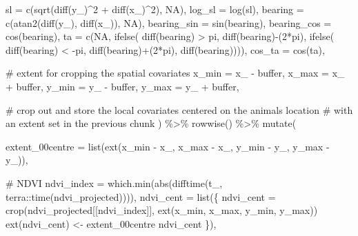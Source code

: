 \documentclass[
  letterpaper,
  DIV=11,
  numbers=noendperiod]{scrartcl}
\newenvironment{Shaded}{\begin{snugshade}}{\end{snugshade}}
\newcommand{\AttributeTok}[1]{\textcolor[rgb]{0.40,0.45,0.13}{#1}}
\newcommand{\CommentTok}[1]{\textcolor[rgb]{0.37,0.37,0.37}{#1}}
\newcommand{\ConstantTok}[1]{\textcolor[rgb]{0.56,0.35,0.01}{#1}}
\newcommand{\DecValTok}[1]{\textcolor[rgb]{0.68,0.00,0.00}{#1}}
\newcommand{\FunctionTok}[1]{\textcolor[rgb]{0.28,0.35,0.67}{#1}}
\newcommand{\NormalTok}[1]{\textcolor[rgb]{0.00,0.23,0.31}{#1}}
\newcommand{\OtherTok}[1]{\textcolor[rgb]{0.00,0.23,0.31}{#1}}
\newcommand{\SpecialCharTok}[1]{\textcolor[rgb]{0.37,0.37,0.37}{#1}}
\begin{document}
\begin{Shaded}
\begin{Highlighting}[]
    \AttributeTok{sl =} \FunctionTok{c}\NormalTok{(}\FunctionTok{sqrt}\NormalTok{(}\FunctionTok{diff}\NormalTok{(y\_)}\SpecialCharTok{\^{}}\DecValTok{2} \SpecialCharTok{+} \FunctionTok{diff}\NormalTok{(x\_)}\SpecialCharTok{\^{}}\DecValTok{2}\NormalTok{), }\ConstantTok{NA}\NormalTok{),}
    \AttributeTok{log\_sl =} \FunctionTok{log}\NormalTok{(sl),}
    \AttributeTok{bearing =} \FunctionTok{c}\NormalTok{(}\FunctionTok{atan2}\NormalTok{(}\FunctionTok{diff}\NormalTok{(y\_), }\FunctionTok{diff}\NormalTok{(x\_)), }\ConstantTok{NA}\NormalTok{),}
    \AttributeTok{bearing\_sin =} \FunctionTok{sin}\NormalTok{(bearing),}
    \AttributeTok{bearing\_cos =} \FunctionTok{cos}\NormalTok{(bearing),}
    \AttributeTok{ta =} \FunctionTok{c}\NormalTok{(}\ConstantTok{NA}\NormalTok{, }\FunctionTok{ifelse}\NormalTok{(}
      \FunctionTok{diff}\NormalTok{(bearing) }\SpecialCharTok{\textgreater{}}\NormalTok{ pi, }\FunctionTok{diff}\NormalTok{(bearing)}\SpecialCharTok{{-}}\NormalTok{(}\DecValTok{2}\SpecialCharTok{*}\NormalTok{pi), }\FunctionTok{ifelse}\NormalTok{(}
        \FunctionTok{diff}\NormalTok{(bearing) }\SpecialCharTok{\textless{}} \SpecialCharTok{{-}}\NormalTok{pi, }\FunctionTok{diff}\NormalTok{(bearing)}\SpecialCharTok{+}\NormalTok{(}\DecValTok{2}\SpecialCharTok{*}\NormalTok{pi), }\FunctionTok{diff}\NormalTok{(bearing)))),}
    \AttributeTok{cos\_ta =} \FunctionTok{cos}\NormalTok{(ta),}
      
    \CommentTok{\# extent for cropping the spatial covariates}
    \AttributeTok{x\_min =}\NormalTok{ x\_ }\SpecialCharTok{{-}}\NormalTok{ buffer,}
    \AttributeTok{x\_max =}\NormalTok{ x\_ }\SpecialCharTok{+}\NormalTok{ buffer,}
    \AttributeTok{y\_min =}\NormalTok{ y\_ }\SpecialCharTok{{-}}\NormalTok{ buffer,}
    \AttributeTok{y\_max =}\NormalTok{ y\_ }\SpecialCharTok{+}\NormalTok{ buffer,}
    
  
    \CommentTok{\# crop out and store the local covariates centered on the animal\textquotesingle{}s location }
    \CommentTok{\# with an extent set in the previous chunk}
\NormalTok{  ) }\SpecialCharTok{\%\textgreater{}\%} \FunctionTok{rowwise}\NormalTok{() }\SpecialCharTok{\%\textgreater{}\%} \FunctionTok{mutate}\NormalTok{(}

    \AttributeTok{extent\_00centre =} \FunctionTok{list}\NormalTok{(}\FunctionTok{ext}\NormalTok{(x\_min }\SpecialCharTok{{-}}\NormalTok{ x\_, x\_max }\SpecialCharTok{{-}}\NormalTok{ x\_, y\_min }\SpecialCharTok{{-}}\NormalTok{ y\_, y\_max }\SpecialCharTok{{-}}\NormalTok{ y\_)),}

    \CommentTok{\# NDVI}
    \AttributeTok{ndvi\_index =} \FunctionTok{which.min}\NormalTok{(}\FunctionTok{abs}\NormalTok{(}\FunctionTok{difftime}\NormalTok{(t\_, terra}\SpecialCharTok{::}\FunctionTok{time}\NormalTok{(ndvi\_projected)))),}
    \AttributeTok{ndvi\_cent =} \FunctionTok{list}\NormalTok{(\{}
\NormalTok{      ndvi\_cent }\OtherTok{=} \FunctionTok{crop}\NormalTok{(ndvi\_projected[[ndvi\_index]], }\FunctionTok{ext}\NormalTok{(x\_min, x\_max, y\_min, y\_max))}
      \FunctionTok{ext}\NormalTok{(ndvi\_cent) }\OtherTok{\textless{}{-}}\NormalTok{ extent\_00centre}
\NormalTok{      ndvi\_cent}
\NormalTok{      \}),}


\end{Highlighting}
\end{Shaded}
\end{document}
